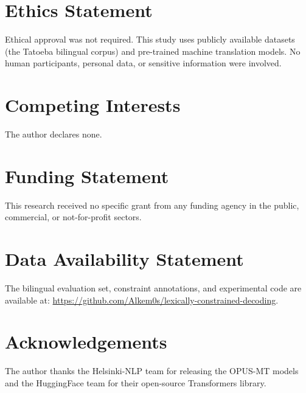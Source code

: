 \documentclass{tlp}
\begin{document}
\section*{Ethics Statement}

Ethical approval was not required. This study uses publicly available datasets (the
Tatoeba bilingual corpus) and pre-trained machine translation models. No human
participants, personal data, or sensitive information were involved.

\section*{Competing Interests}

The author declares none.

\section*{Funding Statement}

This research received no specific grant from any funding agency in the public,
commercial, or not-for-profit sectors.

\section*{Data Availability Statement}

The bilingual evaluation set, constraint annotations, and experimental code are
available at: \url{https://github.com/Alkem0s/lexically-constrained-decoding}.

\section*{Acknowledgements}

The author thanks the Helsinki-NLP team for releasing the OPUS-MT models and the
HuggingFace team for their open-source Transformers library.





\end{document}
